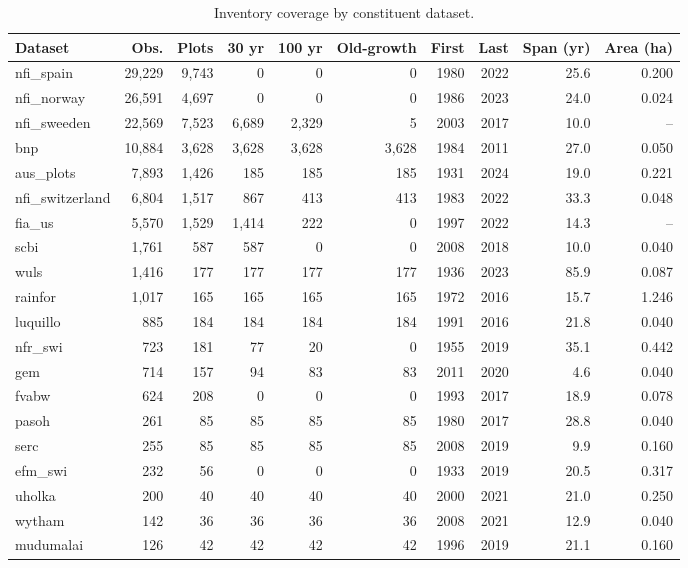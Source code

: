 \begingroup
\sffamily\small
\setlength{\tabcolsep}{3pt}

\begin{longtable}[t]{@{}p{3.2cm}rrrrrrrrr@{}}
\caption{\label{tab:coverage-dataset}Inventory coverage by constituent dataset.}\\
\toprule
Dataset & Obs. & Plots & 30 yr & 100 yr & Old-growth & First & Last & Span (yr) & Area (ha)\\
\midrule
nfi\_spain & 29,229 & 9,743 & 0 & 0 & 0 & 1980 & 2022 & 25.6 & 0.200\\
nfi\_norway & 26,591 & 4,697 & 0 & 0 & 0 & 1986 & 2023 & 24.0 & 0.024\\
nfi\_sweeden & 22,569 & 7,523 & 6,689 & 2,329 & 5 & 2003 & 2017 & 10.0 & --\\
bnp & 10,884 & 3,628 & 3,628 & 3,628 & 3,628 & 1984 & 2011 & 27.0 & 0.050\\
aus\_plots & 7,893 & 1,426 & 185 & 185 & 185 & 1931 & 2024 & 19.0 & 0.221\\
nfi\_switzerland & 6,804 & 1,517 & 867 & 413 & 413 & 1983 & 2022 & 33.3 & 0.048\\
fia\_us & 5,570 & 1,529 & 1,414 & 222 & 0 & 1997 & 2022 & 14.3 & --\\
scbi & 1,761 & 587 & 587 & 0 & 0 & 2008 & 2018 & 10.0 & 0.040\\
wuls & 1,416 & 177 & 177 & 177 & 177 & 1936 & 2023 & 85.9 & 0.087\\
rainfor & 1,017 & 165 & 165 & 165 & 165 & 1972 & 2016 & 15.7 & 1.246\\
luquillo & 885 & 184 & 184 & 184 & 184 & 1991 & 2016 & 21.8 & 0.040\\
nfr\_swi & 723 & 181 & 77 & 20 & 0 & 1955 & 2019 & 35.1 & 0.442\\
gem & 714 & 157 & 94 & 83 & 83 & 2011 & 2020 & 4.6 & 0.040\\
fvabw & 624 & 208 & 0 & 0 & 0 & 1993 & 2017 & 18.9 & 0.078\\
pasoh & 261 & 85 & 85 & 85 & 85 & 1980 & 2017 & 28.8 & 0.040\\
serc & 255 & 85 & 85 & 85 & 85 & 2008 & 2019 & 9.9 & 0.160\\
efm\_swi & 232 & 56 & 0 & 0 & 0 & 1933 & 2019 & 20.5 & 0.317\\
uholka & 200 & 40 & 40 & 40 & 40 & 2000 & 2021 & 21.0 & 0.250\\
wytham & 142 & 36 & 36 & 36 & 36 & 2008 & 2021 & 12.9 & 0.040\\
mudumalai & 126 & 42 & 42 & 42 & 42 & 1996 & 2019 & 21.1 & 0.160\\

\end{longtable}
